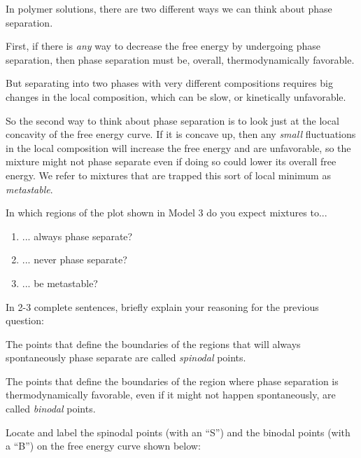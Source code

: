 \begin{activity}
\begin{ctqs}
\end{ctqs}

\begin{infobox}
	In polymer solutions, there are two different ways we can think about phase separation.
	
	First, if there is \emph{any} way to decrease the free energy by undergoing phase separation, then phase separation must be, overall, thermodynamically favorable.
	
	But separating into two phases with very different compositions requires big changes in the local composition, which can be slow, or kinetically unfavorable.
	
	So the second way to think about phase separation is to look just at the local concavity of the free energy curve.  If it is concave up, then any \emph{small} fluctuations in the local composition will increase the free energy and are unfavorable, so the mixture might not phase separate even if doing so could lower its overall free energy.  We refer to mixtures that are trapped this sort of local minimum as \emph{metastable}.
\end{infobox}

\begin{ctqs}
	\question In which regions of the plot shown in Model 3 do you expect mixtures to...
		\begin{enumerate}
			\item ... always phase separate?
			
			\item ... never phase separate?
			
			\item ... be metastable?
		\end{enumerate}
		
	\question In 2-3 complete sentences, briefly explain your reasoning for the previous question:
\end{ctqs}

\begin{infobox}
	The points that define the boundaries of the regions that will always spontaneously phase separate are called \emph{spinodal} points.
	
	The points that define the boundaries of the region where phase separation is thermodynamically favorable, even if it might not happen spontaneously, are called \emph{binodal} points.
\end{infobox}

\begin{ctqs}
	\question Locate and label the spinodal points (with an ``S'') and the binodal points (with a ``B'') on the free energy curve shown below:
	

\end{ctqs}
\end{activity}
